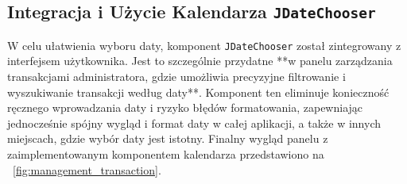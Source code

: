 \begin{minipage}{\linewidth}
\subsection{Integracja i Użycie Kalendarza \texttt{JDateChooser}}
W celu ułatwienia wyboru daty, komponent \texttt{JDateChooser} został zintegrowany z interfejsem użytkownika. Jest to szczególnie przydatne **w panelu zarządzania transakcjami administratora, gdzie umożliwia precyzyjne filtrowanie i wyszukiwanie transakcji według daty**. Komponent ten eliminuje konieczność ręcznego wprowadzania daty i ryzyko błędów formatowania, zapewniając jednocześnie spójny wygląd i format daty w całej aplikacji, a także w innych miejscach, gdzie wybór daty jest istotny. 
Finalny wygląd panelu z zaimplementowanym komponentem kalendarza przedstawiono na \figurename~\ref{fig:management_transaction}.



\end{minipage}
